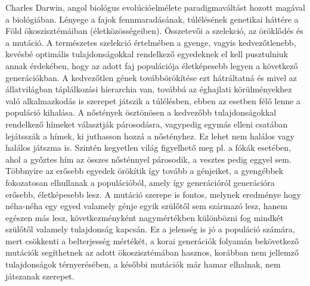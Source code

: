 \documentclass[a4paper,12pt]{article}
\begin{document}
Charles Darwin, angol biológus evolúcióelmélete paradigmaváltást hozott magával a biológiában. 
Lényege a fajok fennmaradásának, túlélésének genetikai háttére a Föld ökoszisztémáiban 
(életközösségeiben). Összetevői a szelekció, az öröklődés és a mutáció. A természetes 
szelekció értelmében a gyenge, vagyis kedvezőtlenebb, kevésbé optimális tulajdonságokkal 
rendelkező egyedeknek el kell pusztulniuk annak érdekében, hogy az adott faj populációja 
életképesebb legyen a következő generációkban. A kedvezőtlen gének továbbörökítése ezt
hátráltatná és mivel az állatvilágban táplálkozási hierarchia van, továbbá az éghajlati 
körülményekhez való alkalmazkodás is szerepet játszik a túlélésben, ebben az esetben félő 
lenne a populáció kihalása. A nőstények ösztönösen a kedvezőbb tulajdonságokkal rendelkező 
hímeket választják párosodásra, vagypedig egymás elleni csatában lejátsszák a hímek, ki 
juthasson hozzá a nőstényhez. Ez lehet nem halálos vagy halálos játszma is. Szintén kegyetlen 
világ figyelhető meg pl. a fókák esetében, ahol a győztes hím az összes nősténnyel párosodik, 
a vesztes pedig eggyel sem. Többnyire az erősebb egyedek örökítik így tovább a génjeiket, a
gyengébbek fokozatosan elhullanak a populációból, amely így generációról generációra erősebb,
életképesebb lesz. A mutáció szerepe is fontos, melynek eredménye hogy néha-néha egy egyed
valamely génje egyik szülőtől sem származó lesz, hanem egészen más lesz, következményként
nagymértékben különbözni fog mindkét szülőtől valamely tulajdonság kapcsán. Ez a jelenség is 
jó a populáció számára, mert csökkenti a belterjesség mértékét, a korai generációk folyamán
bekövetkező mutációk segíthetnek az adott ökoszisztémában hasznos, korábban nem jellemző
tulajdonságok térnyerésében, a későbbi mutációk már hamar elhalnak, nem játszanak szerepet.
\end{document}
